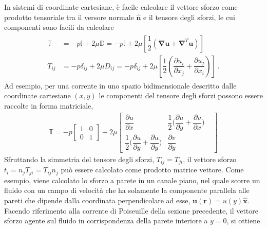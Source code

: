 \documentclass[letterpaper,10pt,italian]{jupyterBook}
\begin{document}
\sphinxAtStartPar
In sistemi di coordinate cartesiane, è facile calcolare il vettore
sforzo come prodotto tensoriale tra il versore normale \(\mathbf{\hat{n}}\) e
il tensore degli sforzi, le cui componenti sono facili da calcolare
\begin{equation*}
\begin{split}\begin{aligned}
 \mathbb{T} & = -p\mathbb{I} + 2\mu\mathbb{D} = -p\mathbb{I} + 2\mu \left[ \dfrac{1}{2} \left( \mathbf{\nabla}\mathbf{u} +\mathbf{\nabla}^T \mathbf{u} \right) \right] \\
 T_{ij} & = -p \delta_{ij} + 2 \mu D_{ij} = -p \delta_{ij} + 2 \mu \left[ \dfrac{1}{2} \left( \dfrac{\partial u_i}{\partial x_j} + \dfrac{\partial u_j}{\partial x_i} \right) \right] \ .
 \end{aligned}\end{split}
\end{equation*}
\sphinxAtStartPar
Ad esempio, per una corrente in uno spazio
bidimensionale descritto dalle coordinate cartesiane \((x,y)\) le
componenti del tensore degli sforzi possono essere raccolte in forma
matriciale,
\begin{equation*}
\begin{split}\mathbb{T} =
 -p \begin{bmatrix}
   1 & 0 \\ 0 & 1
 \end{bmatrix} +
 2 \mu \begin{bmatrix}
  \dfrac{\partial u}{\partial x} & 
  \dfrac{1}{2}\bigg(\dfrac{\partial u}{\partial y} + \dfrac{\partial v}{\partial x}\bigg) \\
  \dfrac{1}{2}\bigg(\dfrac{\partial u}{\partial y} + \dfrac{\partial u}{\partial y}\bigg) &
  \dfrac{\partial v}{\partial y} & 
 \end{bmatrix}\end{split}
\end{equation*}
\sphinxAtStartPar
Sfruttando la simmetria del tensore degli sforzi,
\(T_{ij} = T_{ji}\), il vettore sforzo \(t_i = n_j T_{ji} = T_{ij} n_j\) può
essere calcolato come prodotto matrice vettore. Come esempio, viene
calcolato lo sforzo a parete in un canale piano, nel quale scorre un
fluido con un campo di velocità che ha solamente la componente parallela
alle pareti che dipende dalla coordinata perpendicolare ad esse,
\(\mathbf{u}(\mathbf{r}) = u(y) \mathbf{\hat{x}}\). Facendo riferimento alla corrente
di Poiseuille della sezione precedente, il vettore sforzo agente sul
fluido in corrispondenza della parete interiore a \(y=0\), si ottiene
\end{document}
